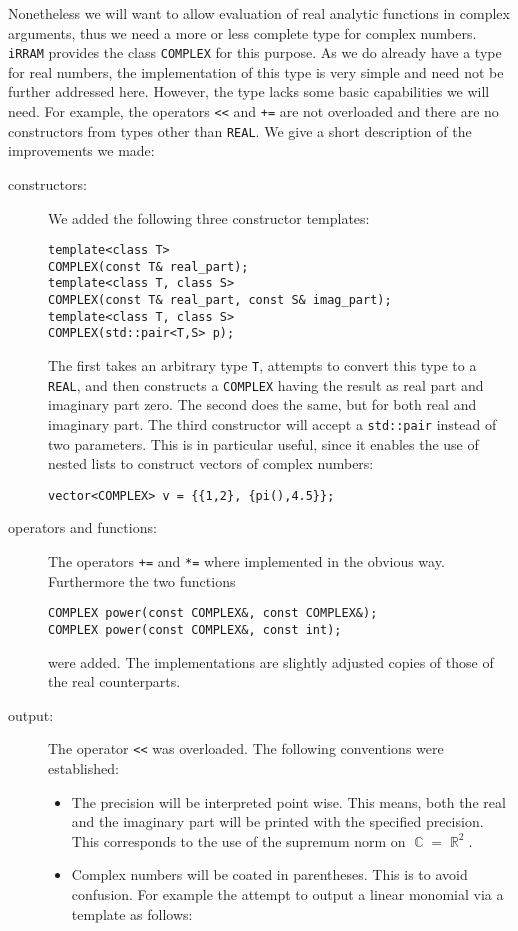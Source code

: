 \documentclass{article}
\DeclareMathOperator{\RR}{\ensuremath{\mathbb{R}}\xspace}
\DeclareMathOperator{\CC}{\ensuremath{\mathbb{C}}\xspace}
\newcommand{\irram}{\texttt{iRRAM}\xspace}
\newcommand{\ir}[1]{\texttt{#1}}
\newcommand{\code}[1]{\texttt{#1}}
\begin{document}
Nonetheless we will want to allow evaluation of real analytic functions in complex arguments, thus we need a more or less complete type for complex numbers. \irram provides the class \ir{COMPLEX} for this purpose. As we do already have a type for real numbers, the implementation of this type is very simple and need not be further addressed here. However, the type lacks some basic capabilities we will need. For example, the operators \ir{<<} and \code{+=} are not overloaded and there are no constructors from types other than \ir{REAL}. We give a short description of the improvements we made:
\begin{description}
\item[constructors:] We added the following three constructor templates:
\begin{lstlisting}
template<class T>
COMPLEX(const T& real_part);
template<class T, class S>
COMPLEX(const T& real_part, const S& imag_part);
template<class T, class S>
COMPLEX(std::pair<T,S> p);
\end{lstlisting}
The first takes an arbitrary type \code{T}, attempts to convert this type to a \ir{REAL}, and then constructs a \ir{COMPLEX} having the result as real part and imaginary part zero. The second does the same, but for both real and imaginary part. The third constructor will accept a \code{std::pair} instead of two parameters. This is in particular useful, since it enables the use of nested lists to construct vectors of complex numbers:
\begin{lstlisting}
vector<COMPLEX> v = {{1,2}, {pi(),4.5}};
\end{lstlisting}
\item[operators and functions:] The operators \code{+=} and \code{*=} where implemented in the obvious way. Furthermore the two functions
\begin{lstlisting}
COMPLEX power(const COMPLEX&, const COMPLEX&);
COMPLEX power(const COMPLEX&, const int);
\end{lstlisting}
were added. The implementations are slightly adjusted copies of those of the real counterparts.
\item[output:] The operator \ir{<<} was overloaded. The following conventions were established:
\begin{itemize}
\item The precision will be interpreted point wise. This means, both the real and the imaginary part will be printed with the specified precision. This corresponds to the use of the supremum norm on $\CC = \RR^2$.
\item Complex numbers will be coated in parentheses. This is to avoid confusion. For example the attempt to output a linear monomial via a template as follows:

\end{itemize}
\end{description}
\end{document}

